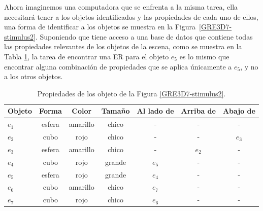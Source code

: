 %


Ahora imaginemos una computadora que se enfrenta a la misma
tarea, ella necesitar\'a tener a los objetos identificados y las propiedades de cada uno de ellos, una forma de identificar a los objetos se muestra en la Figura~\ref{GRE3D7-stimulus2}. Suponiendo que tiene acceso a una base de datos que contiene todas
las propiedades relevantes de los objetos de la escena, como se muestra en la Tabla \ref{tabla-propiedades}, la tarea de encontrar una ER para el objeto $e_5$ es lo mismo que encontrar alguna combinaci\'on de propiedades que se aplica \'unicamente a $e_5$, y no a los otros objetos.\\


\begin{table}[h!]
\begin{center}
\begin{tabular}{|l|c|c|c|c|c|c|}
\hline
Objeto& 	Forma		&	Color	&	Tama\~no & Al lado de & Arriba de	& Abajo de	\\
\hline
$e_1$ & esfera & amarillo & chico & - & - & -\\
$e_2$ & cubo & rojo & chico & - & - & $e_3$\\
$e_3$ & esfera & amarillo & chico & - & $e_2$ & -\\
$e_4$ & cubo & rojo & grande & $e_5$ & - & -\\
$e_5$ & esfera & rojo & grande & $e_4$ & - & -\\
$e_6$ & cubo & amarillo & chico & $e_7$ & - & -\\
$e_7$ & cubo & rojo & chico & $e_6$ & - & -\\

\hline
\end{tabular}
\caption{Propiedades de los objeto de la Figura \ref{GRE3D7-stimulus2}.}
\vspace*{-.5cm}
\label{tabla-propiedades}
\end{center}
\end{table}


